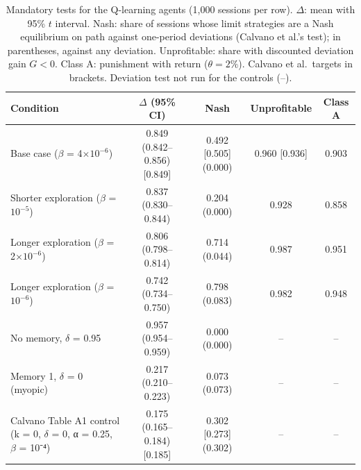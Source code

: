 \begin{table}[t]
\centering\small
\caption{Mandatory tests for the Q-learning agents (1{,}000 sessions per row). $\Delta$: mean with 95\% $t$ interval. Nash: share of sessions whose limit strategies are a Nash equilibrium on path against one-period deviations (Calvano et al.'s test); in parentheses, against any deviation. Unprofitable: share with discounted deviation gain $G<0$. Class A: punishment with return ($\theta = 2\%$). Calvano et al.\ targets in brackets. Deviation test not run for the controls (--).}
\label{tab:mandatory-tests}
\begin{tabular}{lcccc}
\toprule
Condition & $\Delta$ (95\% CI) & Nash & Unprofitable & Class A \\
\midrule
Base case ($\beta$ = 4$\times$$10^{-6}$) & 0.849 (0.842--0.856) [0.849] & 0.492 [0.505] (0.000) & 0.960 [0.936] & 0.903 \\
Shorter exploration ($\beta$ = $10^{-5}$) & 0.837 (0.830--0.844) & 0.204 (0.000) & 0.928 & 0.858 \\
Longer exploration ($\beta$ = 2$\times$$10^{-6}$) & 0.806 (0.798--0.814) & 0.714 (0.044) & 0.987 & 0.951 \\
Longer exploration ($\beta$ = $10^{-6}$) & 0.742 (0.734--0.750) & 0.798 (0.083) & 0.982 & 0.948 \\
\midrule
No memory, $\delta$ = 0.95 & 0.957 (0.954--0.959) & 0.000 (0.000) & -- & -- \\
Memory 1, $\delta$ = 0 (myopic) & 0.217 (0.210--0.223) & 0.073 (0.073) & -- & -- \\
Calvano Table A1 control (k = 0, $\delta$ = 0, α = 0.25, $\beta$ = 10⁻⁴) & 0.175 (0.165--0.184) [0.185] & 0.302 [0.273] (0.302) & -- & -- \\
\bottomrule
\end{tabular}
\end{table}
